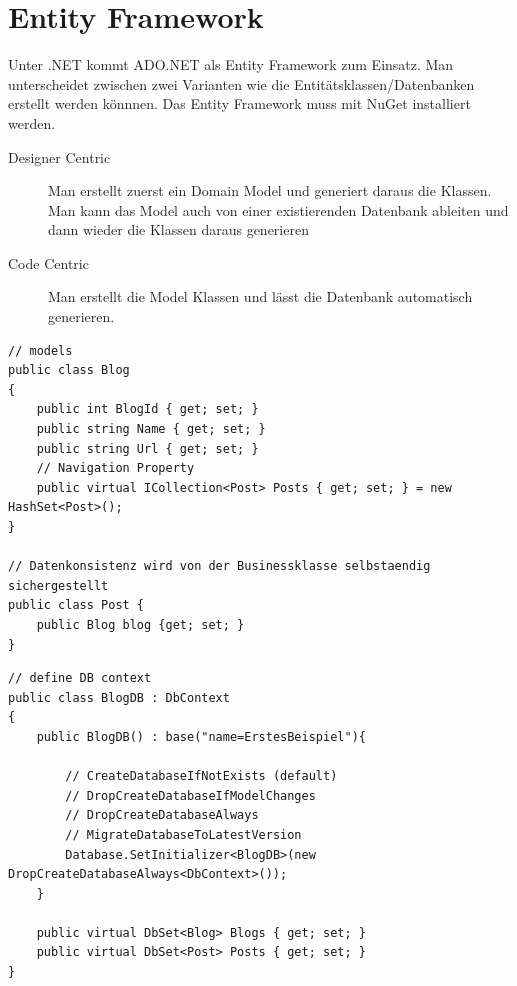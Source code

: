 \section{Entity Framework}
Unter .NET kommt ADO.NET als Entity Framework zum Einsatz. Man unterscheidet zwischen zwei Varianten wie die Entitätsklassen/Datenbanken erstellt werden könnnen. Das Entity Framework muss mit NuGet installiert werden.
\begin{description}
	\item[Designer Centric] Man erstellt zuerst ein Domain Model und generiert daraus die Klassen. Man kann das Model auch von einer existierenden Datenbank ableiten und dann wieder die Klassen daraus generieren
	\item[Code Centric] Man erstellt die Model Klassen und lässt die Datenbank automatisch generieren.
\end{description}

\begin{lstlisting}	
// models
public class Blog
{
	public int BlogId { get; set; }
	public string Name { get; set; }
	public string Url { get; set; }
	// Navigation Property
	public virtual ICollection<Post> Posts { get; set; } = new HashSet<Post>();
}

// Datenkonsistenz wird von der Businessklasse selbstaendig sichergestellt
public class Post {
	public Blog blog {get; set; }
}

\end{lstlisting}

\begin{lstlisting}	
// define DB context
public class BlogDB : DbContext
{
	public BlogDB() : base("name=ErstesBeispiel"){
	
		// CreateDatabaseIfNotExists (default)
		// DropCreateDatabaseIfModelChanges
		// DropCreateDatabaseAlways
		// MigrateDatabaseToLatestVersion
		Database.SetInitializer<BlogDB>(new DropCreateDatabaseAlways<DbContext>());
	}
	
	public virtual DbSet<Blog> Blogs { get; set; }
	public virtual DbSet<Post> Posts { get; set; }
}

\end{lstlisting}


